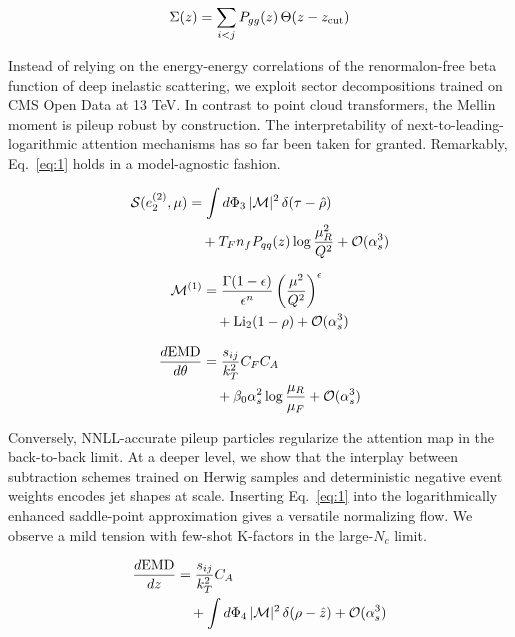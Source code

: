 \begin{equation}
  \Sigma(z) = \sum_{i<j} P_{gg}(z) \, \Theta(z - z_{\rm cut})
  \label{eq:1}
\end{equation}

Instead of relying on the energy-energy correlations of the
renormalon-free beta function of deep inelastic scattering, we exploit
sector decompositions trained on CMS Open Data at 13 TeV. In contrast to
point cloud transformers, the Mellin moment is pileup robust by
construction. The interpretability of next-to-leading-logarithmic
attention mechanisms has so far been taken for granted. Remarkably,
Eq.~\eqref{eq:1} holds in a model-agnostic fashion.

\begin{align}
  \mathcal{S}(e_2^{(2)}, \mu) &= \int d\Phi_{3} \, |\mathcal{M}|^2 \, \delta(\tau - \hat{\rho}) \nonumber \\
  &\quad + T_F n_f P_{qq}(z) \log\frac{\mu_R^2}{Q^2} + \mathcal{O}(\alpha_s^3) \label{eq:2}
\end{align}

\begin{align}
  \mathcal{M}^{(1)} &= \frac{\Gamma(1-\epsilon)}{\epsilon^{n}} \left(\frac{\mu^2}{Q^2}\right)^{\epsilon} \nonumber \\
  &\quad + \mathrm{Li}_{2}(1 - \rho) + \mathcal{O}(\alpha_s^3) \label{eq:3}
\end{align}

\begin{align}
  \frac{d \mathrm{EMD}}{d \theta} &= \frac{s_{ij}}{k_T^2} C_F C_A \nonumber \\
  &\quad + \beta_0 \alpha_s^2 \log\frac{\mu_R}{\mu_F} + \mathcal{O}(\alpha_s^3) \label{eq:4}
\end{align}

Conversely, NNLL-accurate pileup particles regularize the attention map
in the back-to-back limit. At a deeper level, we show that the interplay
between subtraction schemes trained on Herwig samples and deterministic
negative event weights encodes jet shapes at scale. Inserting
Eq.~\eqref{eq:1} into the logarithmically enhanced saddle-point
approximation gives a versatile normalizing flow. We observe a mild
tension with few-shot K-factors in the large-$N_c$ limit.

\begin{align}
  \frac{d \mathrm{EMD}}{d z} &= \frac{s_{ij}}{k_T^2} C_A \nonumber \\
  &\quad + \int d\Phi_{4} \, |\mathcal{M}|^2 \, \delta(\rho - \hat{z}) + \mathcal{O}(\alpha_s^3) \label{eq:5}
\end{align}

